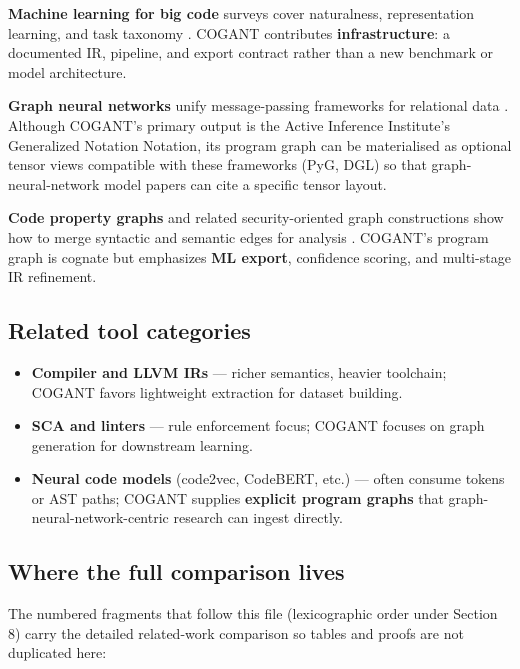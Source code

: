 \documentclass[
]{article}
\providecommand{\tightlist}{%
  \setlength{\itemsep}{0pt}\setlength{\parskip}{0pt}}
\begin{document}
\textbf{Machine learning for big code} surveys cover naturalness,
representation learning, and task taxonomy \citep{allamanis2018survey}.
COGANT contributes \textbf{infrastructure}: a documented IR, pipeline,
and export contract rather than a new benchmark or model architecture.

\textbf{Graph neural networks} unify message-passing frameworks for
relational data \citep{wu2020comprehensive, scarselli2009graph}.
Although COGANT's primary output is the Active Inference Institute's
Generalized Notation Notation, its program graph can be materialised as
optional tensor views compatible with these frameworks (PyG, DGL) so
that graph-neural-network model papers can cite a specific tensor
layout.

\textbf{Code property graphs} and related security-oriented graph
constructions show how to merge syntactic and semantic edges for
analysis \citep{yamaguchi2014modeling}. COGANT's program graph is
cognate but emphasizes \textbf{ML export}, confidence scoring, and
multi-stage IR refinement.

\subsection{Related tool categories}\label{related-tool-categories-1}

\begin{itemize}
\tightlist
\item
  \textbf{Compiler and LLVM IRs} --- richer semantics, heavier
  toolchain; COGANT favors lightweight extraction for dataset building.
\item
  \textbf{SCA and linters} --- rule enforcement focus; COGANT focuses on
  graph generation for downstream learning.
\item
  \textbf{Neural code models} (code2vec, CodeBERT, etc.) --- often
  consume tokens or AST paths; COGANT supplies \textbf{explicit program
  graphs} that graph-neural-network-centric research can ingest
  directly.
\end{itemize}

\subsection{Where the full comparison
lives}\label{where-the-full-comparison-lives}

The numbered fragments that follow this file (lexicographic order under
Section 8) carry the detailed related-work comparison so tables and
proofs are not duplicated here:
\end{document}
